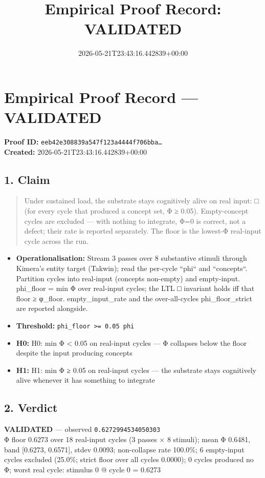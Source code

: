 \documentclass{article}
\title{Empirical Proof Record: VALIDATED}
\date{2026-05-21T23:43:16.442839+00:00}
\begin{document}
\maketitle
\section*{Empirical Proof Record --- \textcolor{validated}{\textbf{VALIDATED}}}
\textbf{Proof ID:} \texttt{eeb42e308839a547f123a4444f706bba\dots}\\
\textbf{Created:} 2026-05-21T23:43:16.442839+00:00
\subsection*{1. Claim}
\begin{quote}Under sustained load, the substrate stays cognitively alive on real input: □ (for every cycle that produced a concept set, Φ ≥ 0.05). Empty-concept cycles are excluded — with nothing to integrate, Φ=0 is correct, not a defect; their rate is reported separately. The floor is the lowest-Φ real-input cycle across the run.\end{quote}
\begin{itemize}
\item \textbf{Operationalisation:} Stream 3 passes over 8 substantive stimuli through Kimera's entity target (Takwin); read the per-cycle ``phi`` and ``concepts``. Partition cycles into real-input (concepts non-empty) and empty-input. phi\_floor = min Φ over real-input cycles; the LTL □ invariant holds iff that floor ≥ φ\_floor. empty\_input\_rate and the over-all-cycles phi\_floor\_strict are reported alongside.
\item \textbf{Threshold:} \texttt{phi\_floor >= 0.05 phi}
\item \textbf{H0:} H0: min Φ < 0.05 on real-input cycles — Φ collapses below the floor despite the input producing concepts
\item \textbf{H1:} H1: min Φ ≥ 0.05 on real-input cycles — the substrate stays cognitively alive whenever it has something to integrate
\end{itemize}
\subsection*{2. Verdict}
\textcolor{validated}{\textbf{VALIDATED}} --- observed \texttt{0.6272994534050303}\\
Φ floor 0.6273 over 18 real-input cycles (3 passes × 8 stimuli); mean Φ 0.6481, band [0.6273, 0.6571], stdev 0.0093; non-collapse rate 100.0\%; 6 empty-input cycles excluded (25.0\%; strict floor over all cycles 0.0000); 0 cycles produced no Φ; worst real cycle: stimulus 0 @ cycle 0 = 0.6273
\end{document}
